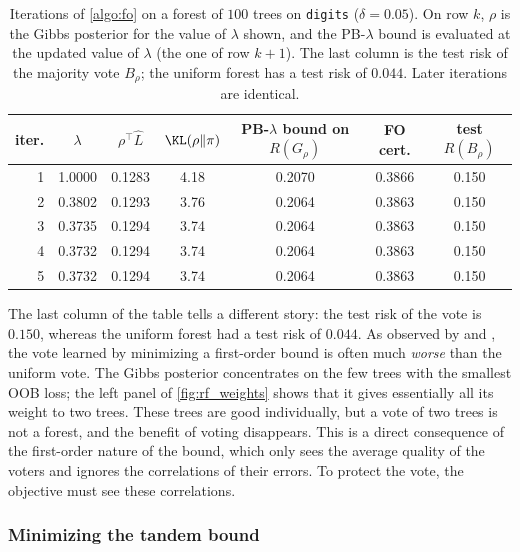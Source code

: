 \begin{table}[t]
\centering\small
\caption{Iterations of \cref{algo:fo} on a forest of $100$ trees on \texttt{digits}
($\delta=0.05$). On row $k$, $\rho$ is the Gibbs posterior for the value of $\lambda$
shown, and the PB-$\lambda$ bound is evaluated at the updated value of $\lambda$ (the one of
row $k+1$). The last column is the test risk of the majority vote $B_\rho$;
the uniform forest has a test risk of $0.044$. Later iterations are identical.}
\label{tab:fo_iterations}
\setlength{\tabcolsep}{4pt}
\begin{tabular}{rcccccc}
\toprule
iter. & $\lambda$ & $\rho^\top\widehat L$ & $\KL(\rho\|\pi)$ & PB-$\lambda$ bound on $R(G_\rho)$ & FO cert. & test $R(B_\rho)$ \\
\midrule
1 & 1.0000 & 0.1283 & 4.18 & 0.2070 & 0.3866 & 0.150 \\
2 & 0.3802 & 0.1293 & 3.76 & 0.2064 & 0.3863 & 0.150 \\
3 & 0.3735 & 0.1294 & 3.74 & 0.2064 & 0.3863 & 0.150 \\
4 & 0.3732 & 0.1294 & 3.74 & 0.2064 & 0.3863 & 0.150 \\
5 & 0.3732 & 0.1294 & 3.74 & 0.2064 & 0.3863 & 0.150 \\
\bottomrule
\end{tabular}
\end{table}

The last column of the table tells a different story: the test risk of the
vote is $0.150$, whereas the uniform forest had a test risk of $0.044$. As
observed by \citet{lorenzen2019pac} and \citet{masegosa2020second}, the vote
learned by minimizing a first-order bound is often much \emph{worse} than the
uniform vote. The Gibbs posterior concentrates on the few trees with the smallest
OOB loss; the left panel of \cref{fig:rf_weights} shows that it gives
essentially all its weight to two trees. These trees are good individually, but
a vote of two trees is not a forest, and the benefit of voting disappears. This
is a direct consequence of the first-order nature of the bound, which only sees
the average quality of the voters and ignores the correlations of their errors.
To protect the vote, the objective must see these correlations.

\subsubsection{Minimizing the tandem bound}

